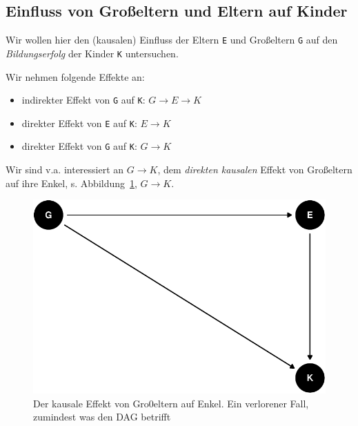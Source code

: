 \documentclass[
  a4paper,
  DIV=11]{scrreprt}
\providecommand{\tightlist}{%
  \setlength{\itemsep}{0pt}\setlength{\parskip}{0pt}}\usepackage{longtable,booktabs,array}
\theoremstyle{definition}
\theoremstyle{remark}
\begin{document}
\hypertarget{einfluss-von-grouxdfeltern-und-eltern-auf-kinder}{%
\subsection{Einfluss von Großeltern und Eltern auf
Kinder}\label{einfluss-von-grouxdfeltern-und-eltern-auf-kinder}}

Wir wollen hier den (kausalen) Einfluss der Eltern \texttt{E} und
Großeltern \texttt{G} auf den \emph{Bildungserfolg} der Kinder
\texttt{K} untersuchen.

Wir nehmen folgende Effekte an:

\begin{itemize}
\tightlist
\item
  indirekter Effekt von \texttt{G} auf \texttt{K}:
  \(G \rightarrow E \rightarrow K\)
\item
  direkter Effekt von \texttt{E} auf \texttt{K}: \(E \rightarrow K\)
\item
  direkter Effekt von \texttt{G} auf \texttt{K}: \(G \rightarrow K\)
\end{itemize}

Wir sind v.a. interessiert an \(G \rightarrow K\), dem \emph{direkten
kausalen} Effekt von Großeltern auf ihre Enkel, s.
Abbildung~\ref{fig-dag-grannies}, \(G \rightarrow K\).

\begin{figure}

{\centering \includegraphics{./kausal_files/figure-pdf/fig-dag-grannies-1.pdf}

}

\caption{\label{fig-dag-grannies}Der kausale Effekt von Gro0eltern auf
Enkel. Ein verlorener Fall, zumindest was den DAG betrifft}

\end{figure}
\end{document}
